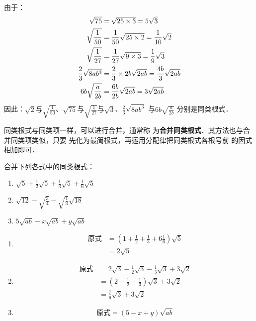 \begin{solution}
由于：
\[\begin{split}
    \sqrt{75}&=\sqrt{25\times 3}=5\sqrt{3}\\
    \sqrt{\dfrac{1}{50}}&=\dfrac{1}{50}\sqrt{25\times 2}=\dfrac{1}{10}\sqrt{2}    \\
    \sqrt{\dfrac{1}{27}}&=\dfrac{1}{27}\sqrt{9\times 3}=\dfrac{1}{9}\sqrt{3}    \\
    \dfrac{2}{3}\sqrt{8ab^3}&=\dfrac{2}{3}\times 2b\sqrt{2ab}=\dfrac{4b}{3}\sqrt{2ab}    \\
    6b\sqrt{\dfrac{a}{2b}}&=\dfrac{6b}{2b}\sqrt{2ab}=3\sqrt{2ab}    \\
\end{split}\]
因此：$\sqrt{2}$与$\sqrt{\frac{1}{50}}$、$\sqrt{75}$与$\sqrt{\frac{1}{27}}$与$\sqrt{3}$、$\frac{2}{3}\sqrt{8ab^3}$
与$6b\sqrt{\frac{a}{2b}}$ 分别是同类根式． 
\end{solution}

同类根式与同类项一样，可以进行合并，通常称
为\textbf{合并同类根式}．其方法也与合并同类项类似，只要
先化为最简根式，再运用分配律把同类根式各根号前
的因式相加即可．

\begin{example}
    合并下列各式中的同类根式：
\begin{enumerate}
    \item $\sqrt{5}+\frac{1}{2}\sqrt{5}+\frac{1}{3}\sqrt{5}+\frac{1}{6}\sqrt{5}$
    \item $\sqrt{12}-\sqrt{\frac{3}{4}}-\sqrt{\frac{1}{3}}\sqrt{18}$
    \item $5\sqrt{ab}-x\sqrt{ab}+y\sqrt{ab}$
\end{enumerate}
\end{example}

\begin{solution}
\begin{enumerate}
    \item \[\begin{split}
        \text{原式}&=\left(1+\frac{1}{2}+\frac{1}{3}+6\frac{1}{6}\right)\sqrt{5}\\
        &=2\sqrt{5}
    \end{split}\]
    \item \[\begin{split}
        \text{原式}&=2\sqrt{3}-\frac{1}{2}\sqrt{3}-\frac{1}{3}\sqrt{3}+3\sqrt{2}\\
        &=\left(2-\frac{1}{2}-\frac{1}{3}\right)\sqrt{3}+3\sqrt{2}\\
        &=\frac{7}{6}\sqrt{3}+3\sqrt{2}
    \end{split}\]
    \item  \[\text{原式}=(5-x+y)\sqrt{ab}\]
\end{enumerate}
\end{solution}

